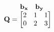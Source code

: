 \documentclass[preview]{standalone}
\begin{document}
\begin{align*}
\begin{array}{ccc}\begin{matrix}\hspace{1cm} \mathbf{b_{x}} & \mathbf{b_{y}} \hspace{0.6cm} \end{matrix} \\ \mathbf{Q} = \begin{bmatrix} 2 & 1 & 1 \\ 0 & 2 & 3 \end{bmatrix} \end{array}
\end{align*}
\end{document}
